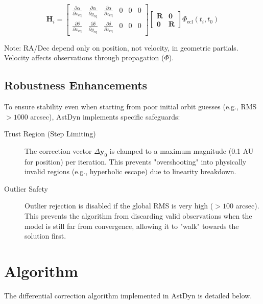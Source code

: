\begin{equation}
    \mathbf{H}_i = \begin{bmatrix}
        \frac{\partial \alpha}{\partial x_{\text{eq}}} & \frac{\partial \alpha}{\partial y_{\text{eq}}} & \frac{\partial \alpha}{\partial z_{\text{eq}}} & 0 & 0 & 0 \\
        \frac{\partial \delta}{\partial x_{\text{eq}}} & \frac{\partial \delta}{\partial y_{\text{eq}}} & \frac{\partial \delta}{\partial z_{\text{eq}}} & 0 & 0 & 0
    \end{bmatrix} 
    \begin{bmatrix}
        \mathbf{R} & \mathbf{0} \\
        \mathbf{0} & \mathbf{R}
    \end{bmatrix}
    \Phi_{\text{ecl}}(t_i, t_0)
\end{equation}

Note: RA/Dec depend only on position, not velocity, in geometric partials. Velocity affects observations through propagation ($\Phi$).

\subsection{Robustness Enhancements}

To ensure stability even when starting from poor initial orbit guesses (e.g., RMS $> 1000$ arcsec), AstDyn implements specific safeguards:

\begin{description}
    \item[Trust Region (Step Limiting)] The correction vector $\Delta\mathbf{y}_0$ is clamped to a maximum magnitude (0.1 AU for position) per iteration. This prevents "overshooting" into physically invalid regions (e.g., hyperbolic escape) due to linearity breakdown.
    
    \item[Outlier Safety] Outlier rejection is disabled if the global RMS is very high ($> 100$ arcsec). This prevents the algorithm from discarding valid observations when the model is still far from convergence, allowing it to "walk" towards the solution first.
\end{description}

\section{Algorithm}
The differential correction algorithm implemented in AstDyn is detailed below.

